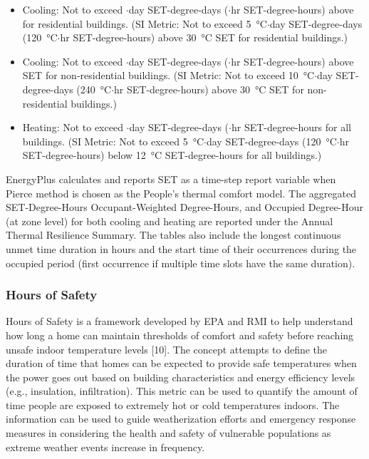 \begin{itemize}
\item Cooling: Not to exceed $\cdot$day SET-degree-days ($\cdot$hr SET-degree-hours)
  above  for residential buildings. (SI Metric: Not to exceed
  \SI{5}{\celsius}$\cdot$day SET-degree-days (\SI{120}{\celsius}$\cdot$hr SET-degree-hours) above
  \SI{30}{\celsius} SET for residential buildings.)
\item Cooling: Not to exceed $\cdot$day SET-degree-days ($\cdot$hr SET-degree-hours)
  above  SET for non-residential buildings. (SI Metric: Not to
  exceed \SI{10}{\celsius}$\cdot$day SET-degree-days (\SI{240}{\celsius}$\cdot$hr SET-degree-hours) above
  \SI{30}{\celsius} SET for non-residential buildings.)
\item Heating: Not to exceed $\cdot$day SET-degree-days ($\cdot$hr SET-degree-hours
  for all buildings. (SI Metric: Not to exceed \SI{5}{\celsius}$\cdot$day SET-degree-days
  (\SI{120}{\celsius}$\cdot$hr SET-degree-hours) below \SI{12}{\celsius} SET-degree-hours for all
  buildings.)
\end{itemize}

EnergyPlus calculates and reports SET as a time-step report variable when Pierce
method is chosen as the People's thermal comfort model. The aggregated
SET-Degree-Hours Occupant-Weighted Degree-Hours, and Occupied Degree-Hour (at
zone level) for both cooling and heating are reported under the Annual Thermal
Resilience Summary. The tables also include the longest continuous unmet time
duration in hours and the start time of their occurrences during the occupied
period (first occurrence if multiple time slots have the same duration).

\subsubsection{Hours of Safety}\label{hours-of-safety}

Hours of Safety is a framework developed by EPA and RMI to help understand how
long a home can maintain thresholds of comfort and safety before reaching unsafe
indoor temperature levels [10]. The concept attempts to define the duration of
time that homes can be expected to provide safe temperatures when the power goes
out based on building characteristics and energy efficiency levels (e.g.,
insulation, infiltration). This metric can be used to quantify the amount of
time people are exposed to extremely hot or cold temperatures indoors. The
information can be used to guide weatherization efforts and emergency response
measures in considering the health and safety of vulnerable populations as
extreme weather events increase in frequency.

